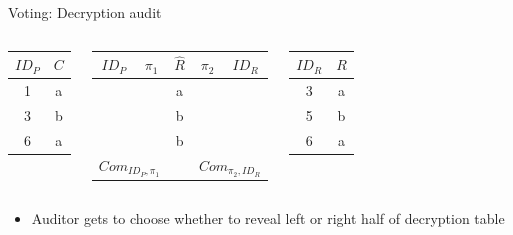 \documentclass{beamer}
\begin{document}
\begin{frame}{Voting: Decryption audit}
	\begin{columns}
		\begin{center}
			\begin{tabular}{|c|c|}
				\hline
				$ID_P$ & $C$ \\
				\hline
				1 & a \\
				3 & b \\
				6 & a \\
				\hline
			\end{tabular}
		\end{center}
		\begin{center}
			\begin{tabular}{|c|c|c|c|c|}
				\hline
				$ID_P$ & $\pi_1$ & $\hat{R}$ & $\pi_2$ & $ID_R$ \\
				\hline
				  &                     & a &                     &   \\
				  &                     & b &                     &   \\
				  &                     & b &                     &   \\
				\hline
				\multicolumn{2}{|c|}{$Com_{ID_P, \pi_1}$} &   & \multicolumn{2}{c|}{$Com_{\pi_2, ID_R}$} \\
				\hline
			\end{tabular}
		\end{center}
		\begin{center}
			\begin{tabular}{|c|c|}
				\hline
				$ID_R$ & $R$ \\
				\hline
				3 & a \\
				5 & b \\
				6 & a \\
				\hline
			\end{tabular}
		\end{center}
	\end{columns}

	\begin{itemize}
		\item Auditor gets to choose whether to reveal left or right half of decryption table
	\end{itemize}
\end{frame}
\end{document}
